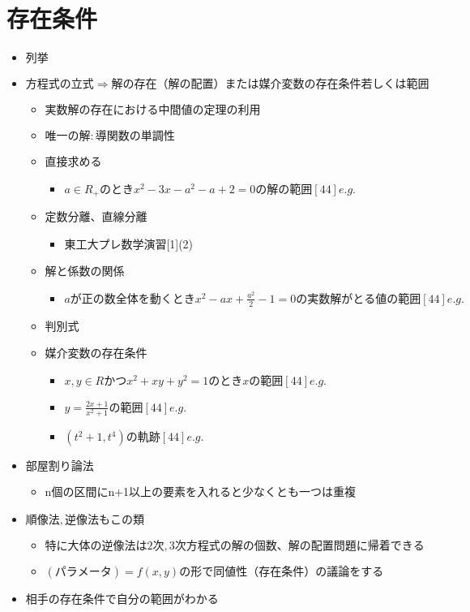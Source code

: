\documentclass[dvipdfmx,uplatex]{jsarticle}
\begin{document}
\section{存在条件}
\begin{itemize}
	\item $ 列挙$
	\item $ 方程式の立式 \Rightarrow 解の存在（解の配置）または媒介変数の存在条件若しくは範囲$
	\begin{itemize}
		\item $ 実数解の存在における中間値の定理の利用$
		\item $ 唯一の解: 導関数の単調性$
		\item 直接求める
		\begin{itemize}
			\item $a\in R_+のときx^2-3x-a^2-a+2=0の解の範囲[44]e.g.$
		\end{itemize}
		\item 定数分離、直線分離
		\begin{itemize}
			\item 東工大プレ数学演習[1](2)
		\end{itemize}
		\item 解と係数の関係
		\begin{itemize}
			\item $aが正の数全体を動くときx^2-ax+\frac{a^2}{2}-1=0の実数解がとる値の範囲[44]e.g.$
		\end{itemize}
		\item 判別式
		\item 媒介変数の存在条件
		\begin{itemize}
			\item $x,y\in Rかつx^2+xy+y^2=1のときxの範囲[44]e.g.$
			\item $y=\frac{2x+1}{x^2+1}の範囲[44]e.g.$
			\item $(t^2+1,t^4)の軌跡[44]e.g.$
		\end{itemize}
	\end{itemize}
	\item $ 部屋割り論法$
	\begin{itemize}
		\item n個の区間にn+1以上の要素を入れると少なくとも一つは重複
	\end{itemize}
	\item $ 順像法,逆像法もこの類$
	\begin{itemize}
		\item $ 特に大体の逆像法は2次,3次方程式の解の個数、解の配置問題に帰着できる$
		\item $ (パラメータ) = f(x,y) の形で同値性（存在条件）の議論をする$
	\end{itemize}
	\item 相手の存在条件で自分の範囲がわかる
\end{itemize}
\end{document}
